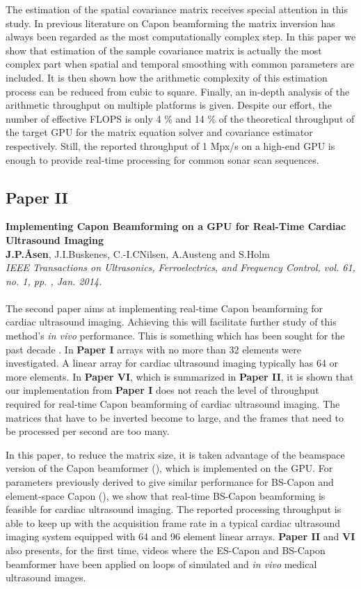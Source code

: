 The estimation of the spatial covariance matrix receives special attention in this study. In previous literature on Capon beamforming the matrix inversion has always been regarded as the most computationally complex step. In this paper we show that estimation of the sample covariance matrix is actually the most complex part when spatial and temporal smoothing with common parameters are included. It is then shown how the arithmetic complexity of this estimation process can be reduced from cubic to square. Finally, an in-depth analysis of the arithmetic throughput on multiple platforms is given. Despite our effort, the number of effective FLOPS is only 4 \% and 14 \% of the theoretical throughput of the target GPU for the matrix equation solver and covariance estimator respectively. Still, the reported throughput of 1 Mpx/s on a high-end GPU is enough to provide real-time processing for common sonar scan sequences.

\subsection{Paper II}
\textbf{Implementing Capon Beamforming on a GPU for Real-Time Cardiac Ultrasound Imaging}\\
\textbf{J.\:P.\:\AA{}sen}, J.\:I.\:Buskenes, C.-I.\:C\:Nilsen, A.\:Austeng and S.\:Holm\\
{\it IEEE Transactions on Ultrasonics, Ferroelectrics, and Frequency Control, vol. 61, no. 1, pp. , Jan. 2014.}\\\\
The second paper aims at implementing real-time Capon beamforming for cardiac ultrasound imaging. Achieving this will facilitate further study of this method's \textit{in vivo} performance. This is something which has been sought for the past decade . In \textbf{Paper I} arrays with no more than 32 elements were investigated. A linear array for cardiac ultrasound imaging typically has 64 or more elements. In \textbf{Paper VI}, which is summarized in \textbf{Paper II}, it is shown that our implementation from  \textbf{Paper I} does not reach the level of throughput required for real-time Capon beamforming of cardiac ultrasound imaging. The matrices that have to be inverted become to large, and the frames that need to be processed per second are too many.

In this paper, to reduce the matrix size, it is taken advantage of the beamspace version of the Capon beamformer (), which is implemented on the GPU. For parameters previously derived to give similar performance for BS-Capon and element-space Capon (), we show that real-time BS-Capon beamforming is feasible for cardiac ultrasound imaging. The reported processing throughput is able to keep up with the acquisition frame rate in a typical cardiac ultrasound imaging system equipped with 64 and 96 element linear arrays.  \textbf{Paper II} and \textbf{VI} also presents, for the first time, videos where the ES-Capon and BS-Capon beamformer have been applied on loops of simulated and \textit{in vivo} medical ultrasound images.

